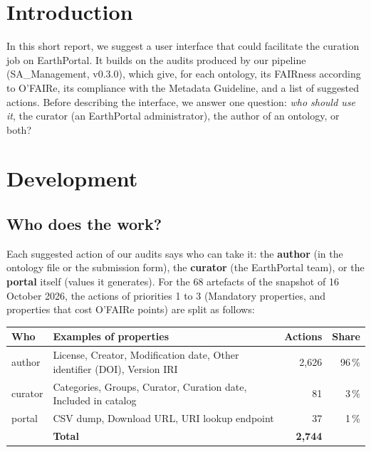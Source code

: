 \documentclass[11pt,a4paper]{article}
\begin{document}
\makereporttitlepage

\section{Introduction}

In this short report, we suggest a user interface that could facilitate the curation job on
EarthPortal. It builds on the audits produced by our pipeline (SA\_Management, v0.3.0), which give, for
each ontology, its FAIRness according to O'FAIRe, its compliance with the Metadata Guideline, and a
list of suggested actions. Before describing the interface, we answer one question: \emph{who should
use it}, the curator (an EarthPortal administrator), the author of an ontology, or both?

\section{Development}

\subsection{Who does the work?}

Each suggested action of our audits says who can take it: the \textbf{author} (in the ontology file or
the submission form), the \textbf{curator} (the EarthPortal team), or the \textbf{portal} itself (values
it generates). For the 68 artefacts of the snapshot of 16 October 2026, the actions of priorities 1 to 3
(Mandatory properties, and properties that cost O'FAIRe points) are split as follows:

\begin{center}\small\renewcommand{\arraystretch}{1.2}
\begin{tabular}{@{}l>{\raggedright\arraybackslash}p{8.4cm}rr@{}}
\toprule
\textbf{Who} & \textbf{Examples of properties} & \textbf{Actions} & \textbf{Share} \\
\midrule
author  & License, Creator, Modification date, Other identifier (DOI), Version IRI & 2,626 & 96\,\% \\
curator & Categories, Groups, Curator, Curation date, Included in catalog & 81 & 3\,\% \\
portal  & CSV dump, Download URL, URI lookup endpoint & 37 & 1\,\% \\
\midrule
        & \textbf{Total} & \textbf{2,744} & \\
\bottomrule
\end{tabular}
\label{tab:who}
\end{center}
\end{document}
